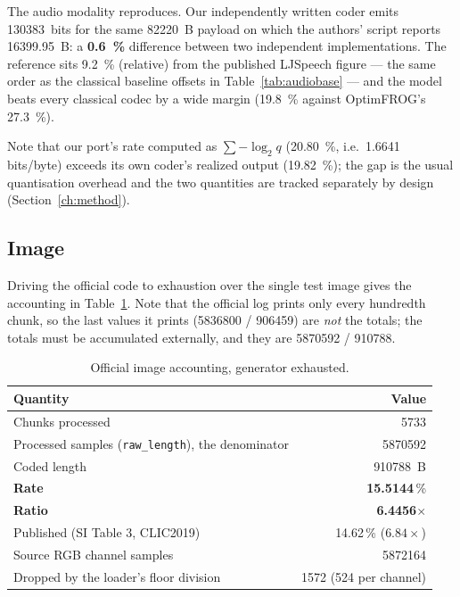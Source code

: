 \documentclass[11pt,a4paper]{article}
\newcommand{\code}[1]{\texttt{\small #1}}
\begin{document}
The audio modality reproduces. Our independently written coder emits
\SI{130383}{bits} for the same \SI{82220}{B} payload on which the authors' script
reports \SI{16399.95}{B}: a \textbf{\SI{0.6}{\%}} difference between two
independent implementations. The reference sits \SI{9.2}{\%} (relative)
from the published LJSpeech figure --- the same order as the classical baseline
offsets in Table~\ref{tab:audiobase} --- and the model beats every classical
codec by a wide margin (\SI{19.8}{\%} against OptimFROG's
\SI{27.3}{\%}).

Note that our port's rate computed as $\sum -\log_2 q$ (\SI{20.80}{\%},
i.e.\ \num{1.6641} bits/byte) exceeds its own coder's realized output
(\SI{19.82}{\%}); the gap is the usual quantisation overhead and the two
quantities are tracked separately by design
(Section~\ref{ch:method}).

\subsection{Image}
\label{sec:imgbase}

Driving the official code to exhaustion over the single test image gives the
accounting in Table~\ref{tab:imgaccount}. Note that the official log prints only
every hundredth chunk, so the last values it prints
(\num{5836800} / \num{906459}) are \emph{not} the totals; the totals must be
accumulated externally, and they are \num{5870592} / \num{910788}.

\begin{table}[htbp]
\centering
\small
\caption{Official image accounting, generator exhausted.}
\label{tab:imgaccount}
\begin{tabular}{lr}
\toprule
Quantity & Value \\
\midrule
Chunks processed & \num{5733} \\
Processed samples (\code{raw\_length}), the denominator & \num{5870592} \\
Coded length & \SI{910788}{B} \\
\textbf{Rate} & \textbf{15.5144}\,\% \\
\textbf{Ratio} & \textbf{6.4456}$\times$ \\
Published (SI Table 3, CLIC2019) & 14.62\,\% ($6.84\times$) \\
Source RGB channel samples & \num{5872164} \\
Dropped by the loader's floor division & \num{1572} (524 per channel) \\
\bottomrule
\end{tabular}
\end{table}
\end{document}
